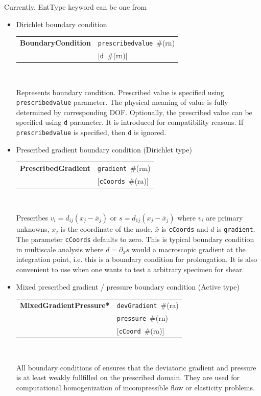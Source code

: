 \documentclass[a4paper]{article}
\makeatletter
\newcommand{\param}[1]{\texttt{#1}} %
\newcommand{\optional}[1]{[#1]} %
\newcommand{\field}[2]{\param{#1}~\#{\tiny(#2)}} %
\newcommand{\optField}[2]{\optional{\field{#1}{#2}}}
\newcommand{\entKeywordInst}[1]{\textbf{#1}} %
\newenvironment{record}[1][]{\begin{tabular}{|ll}}{\end{tabular}\\}
\newcommand{\recentry}[2]{{#1}&{#2}\\}
\newcounter{rcc}
\newenvironment{record}[1][\textwidth]{\setcounter{rcc}{0}\begin{tabular*}{#1}{|ll@{\extracolsep{\fill}}r}}{\end{tabular*}\\}
\newcommand{\recentry}[2]{\ifthenelse{\value{rcc}>0}{&$\backslash$ \\}{\setcounter{rcc}{1}}{#1}&{#2}}
\makeatother
\begin{document}
Currently, EntType keyword can be one from
\begin{itemize}
\item Dirichlet boundary condition

\noindent
\begin{record}[0.9\textwidth]
  \recentry{\entKeywordInst{BoundaryCondition}}{\field{prescribedvalue}{rn}}
  \recentry{}{\optField{d}{rn}}
\end{record}

Represents boundary condition.
Prescribed value is specified using \param{prescribedvalue} parameter.
The physical meaning of value is fully determined by corresponding DOF.
Optionally, the prescribed value can be specified using \param{d}
parameter. It is introduced for compatibility reasons. If
\param{prescribedvalue} is specified, then \param{d} is ignored.

\item Prescribed gradient boundary condition (Dirichlet type)

\begin{record}[0.9\textwidth]
  \recentry{\entKeywordInst{PrescribedGradient}}{\field{gradient}{rm}}
  \recentry{}{\optField{cCoords}{ra}}
\end{record}

Prescribes $ v_i = d_{ij}(x_j-\bar{x}_j) $ or $ s = d_{1j}(x_j - \bar{x}_j) $
where $ v_i $ are primary unknowns, $x_j$ is the coordinate of the node, $\bar x$ is \param{cCoords} and $d$ is \param{gradient}.
The parameter \param{cCoords} defaults to zero.
This is typical boundary condition in multiscale analysis where $ d = \partial_x s$
would a macroscopic gradient at the integration point, i.e. this is a boundary condition for prolongation.
It is also convenient to use when one wants to test a arbitrary specimen for shear. 

\item Mixed prescribed gradient / pressure boundary condition (Active type)

\begin{record}[0.9\textwidth]
  \recentry{\entKeywordInst{MixedGradientPressure*}}{\field{devGradient}{ra}}
  \recentry{}{\field{pressure}{rn}}
  \recentry{}{\optField{cCoord}{ra}}
\end{record}

All boundary conditions of ensures that the deviatoric gradient and pressure is at least weakly fullfilled on the prescribed domain. They are used for computational homogenization of incompressible flow or elasticity problems.


\end{itemize}
\end{document}
